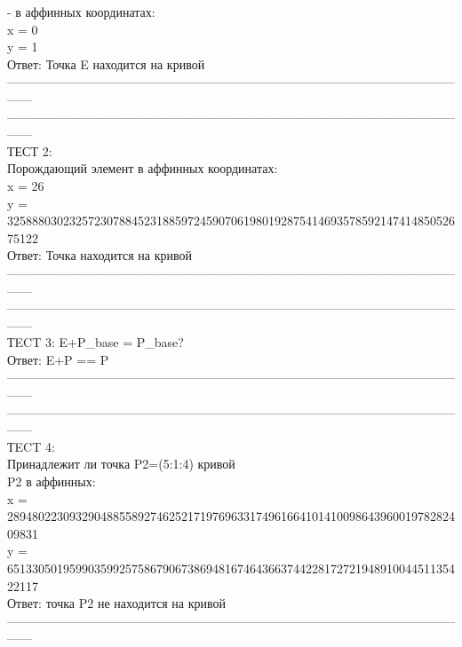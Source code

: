\documentclass[a4paper,12pt]{article}
\begin{document}
	- в аффинных координатах:\\
	x = 0\\
	y = 1\\
	
	Ответ: Точка E находится на кривой\\
	------------------------------------------------------------------------------------------------------------------\\
	
	------------------------------------------------------------------------------------------------------------------\\
	ТЕСТ 2:\\
	Порождающий элемент в аффинных координатах:\\
	x = 26\\
	y = 32588803023257230788452318859724590706198019287541469357859214741485052675122\\
	
	Ответ: Точка находится на кривой\\
	------------------------------------------------------------------------------------------------------------------\\
	
	------------------------------------------------------------------------------------------------------------------\\
	ТECT 3: E+P\_base = P\_base?\\
	Ответ: E+P == P\\
	------------------------------------------------------------------------------------------------------------------\\
	
	------------------------------------------------------------------------------------------------------------------\\
	ТECT 4:\\
	Принадлежит ли точка P2=(5:1:4) кривой\\
	P2 в аффинных:\\
	x = 28948022309329048855892746252171976963317496166410141009864396001978282409831\\
	y = 65133050195990359925758679067386948167464366374422817272194891004451135422117\\
	
	Ответ: точка P2 не находится на кривой\\
	------------------------------------------------------------------------------------------------------------------\\
	
\end{document}

